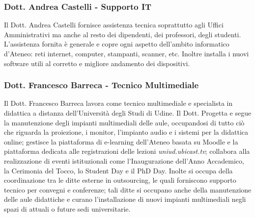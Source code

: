         \subsubsection{Dott. Andrea Castelli - Supporto IT}
            Il Dott. Andrea Castelli fornisce assistenza tecnica soprattutto agli Uffici Amministrativi ma anche al resto dei dipendenti, dei professori, degli studenti. L'assistenza fornita è generale e copre ogni aspetto dell'ambito informatico d'Ateneo: reti internet, computer, stampanti, scanner, etc. Inoltre installa i nuovi software utili al corretto e migliore andamento dei dispositivi.
        \subsubsection{Dott. Francesco Barreca - Tecnico Multimediale}
            Il Dott. Francesco Barreca lavora come tecnico multimediale e specialista in didattica a distanza dell’Università degli Studi di Udine. Il Dott. Progetta e segue la manutenzione degli impianti multimediali delle aule, occupandosi di tutto ciò che riguarda la proiezione, i monitor, l'impianto audio e i sistemi per la didattica online; gestisce la piattaforma di e-learning dell'Ateneo basata su Moodle e la piattaforma dedicata alle registrazioni delle lezioni \emph{uniud.ubicast.tv}; collabora alla realizzazione di eventi istituzionali come l'Inaugurazione dell'Anno Accademico, la Cerimonia del Tocco, lo Student Day e il PhD Day. \newline
            Inolte si occupa della coordinazione tra le ditte esterne in outsourcing, le quali forniscono supporto tecnico per convegni e conferenze; tali ditte si occupano anche della manutenzione delle aule didattiche e curano l'installazione di nuovi impianti multimediali negli spazi di attuali o future sedi universitarie.
